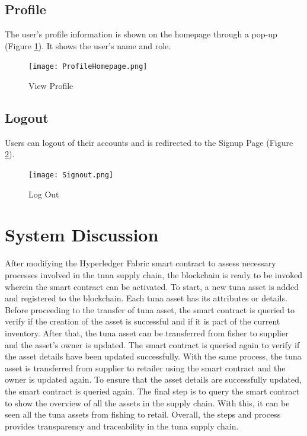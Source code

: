 \subsection{Profile}
The user's profile information is shown on the homepage through a pop-up (Figure \ref{fig:view_profile}). It shows the user's name and role.

\begin{figure}[H]
	\centering
	\texttt{[image: ProfileHomepage.png]}
	\caption{View Profile}
	\label{fig:view_profile}
\end{figure}

\subsection{Logout}
Users can logout of their accounts and is redirected to the Signup Page (Figure \ref{fig:signout}).

\begin{figure}[H]
	\centering
	\texttt{[image: Signout.png]}
	\caption{Log Out}
	\label{fig:signout}
\end{figure} 

\section{System Discussion}
After modifying the Hyperledger Fabric smart contract to assess necessary processes involved in the tuna supply chain, the blockchain is ready to be invoked wherein the smart contract can be activated. To start, a new tuna asset is added and registered to the blockchain. Each tuna asset has its attributes or details. Before proceeding to the transfer of tuna asset, the smart contract is queried to verify if the creation of the asset is successful and if it is part of the current inventory. After that, the tuna asset can be transferred from fisher to supplier and the asset's owner is updated. The smart contract is queried again to verify if the asset details have been updated successfully. With the same process, the tuna asset is transferred from supplier to retailer using the smart contract and the owner is updated again. To ensure that the asset details are successfully updated, the smart contract is queried again. The final step is to query the smart contract to show the overview of all the assets in the supply chain. With this, it can be seen all the tuna assets from fishing to retail. Overall, the steps and process provides transparency and traceability in the tuna supply chain.

